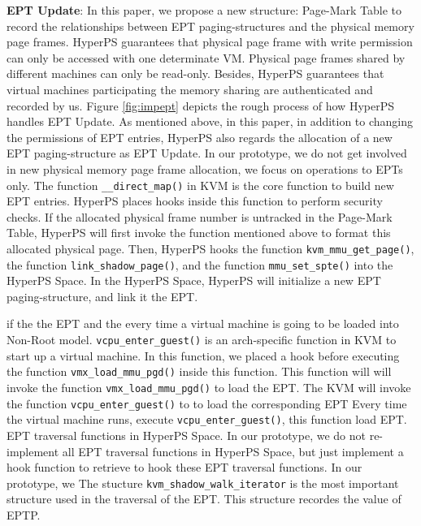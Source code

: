 \textbf{EPT Update}: 
In this paper, we propose a new structure: Page-Mark Table to record the relationships between EPT paging-structures and the physical memory page frames. 
HyperPS guarantees that physical page frame with write permission can only be accessed with one determinate VM. 
Physical page frames shared by different machines can only be read-only. 
Besides, HyperPS guarantees that virtual machines participating the memory sharing are authenticated and recorded by us. 
Figure \ref{fig:impept} depicts the rough process of how HyperPS handles EPT Update. 
As mentioned above, in this paper, in addition to changing the permissions of EPT entries, HyperPS also regards the allocation of a new EPT paging-structure as EPT Update. 
In our prototype, we do not get involved in new physical memory page frame allocation, we focus on operations to EPTs only. 
The function \verb|__direct_map()| in KVM is the core function to build new EPT entries. HyperPS places hooks inside this function to perform security checks. If the allocated physical frame number is untracked in the Page-Mark Table, HyperPS will first invoke the function mentioned above to format this allocated physical page. Then, HyperPS hooks the function \verb|kvm_mmu_get_page()|, the function \verb|link_shadow_page()|, and the function \verb|mmu_set_spte()| into the HyperPS Space.
In the HyperPS Space, HyperPS will initialize a new EPT paging-structure, and link it the EPT.
\fi

\iffalse
if the the EPT and the 
every time a virtual machine is going to be loaded into Non-Root model. 
\verb|vcpu_enter_guest()| is an arch-specific function in KVM to start up a virtual machine. 
In this function, we placed a hook before executing the function \verb|vmx_load_mmu_pgd()| inside this function. 
This function will will invoke the function \verb|vmx_load_mmu_pgd()| to load the EPT. 
The KVM will invoke the function \verb|vcpu_enter_guest()| to 
to load the corresponding EPT 
Every time the virtual machine runs, execute \verb|vcpu_enter_guest()|, this function load EPT.
EPT traversal functions in HyperPS Space.
In our prototype, we do not re-implement all EPT traversal functions in HyperPS Space, but just implement a hook function to retrieve
to hook these EPT traversal functions. 
In our prototype, we 
The stucture \verb|kvm_shadow_walk_iterator| is the most important structure used in the traversal of the EPT. 
This structure recordes the value of EPTP. 


